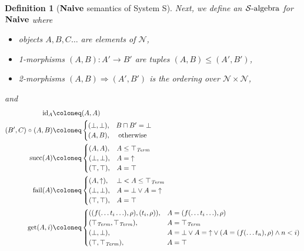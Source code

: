 \documentclass{article}
\newtheorem{definition}[theorem]{Definition}
\newcommand{\fail}{\ensuremath \text{$\uparrow$}}
\newcommand{\Term}{\ensuremath \mathit{Term}}
\newcommand{\Cat}[1]{\ensuremath \mathbf{#1}}
\newcommand{\id}{\ensuremath \operatorname{id}}
\newcommand{\Naive}{\ensuremath \Cat{Naive}}
\newcommand{\SAlgebra}{\ensuremath \mathcal{S}\text{-algebra}}
\newcommand{\lfail}{\ensuremath \operatorname{fail}}
\newcommand{\lsucc}{\ensuremath \operatorname{succ}}
\newcommand{\get}{\ensuremath \operatorname{get}}
\newcommand{\ttop}{\ensuremath \top_{\Term}}
\newcommand{\comp}{\ensuremath \mathrel{\circ}}
\begin{document}
\begin{definition}[$\Naive$ semantics of System S]
  Next, we define an $\SAlgebra$ for $\Naive$ where  
  \begin{itemize}
  \item objects $A,B,C \ldots$ are elements of $\mathcal{N}$,
  \item 1-morphisms $(A,B) : A' \rightarrow B'$ are tuples $(A,B) \leq (A',B')$,
  \item 2-morphisms $(A,B) \Rightarrow (A',B')$ is the ordering over $\mathcal{N} \times \mathcal{N}$,
  \end{itemize}
  and
  \begin{align*}
    \id_A &\coloneq (A,A) \\
    (B',C) \comp (A,B) &\coloneq
                \begin{cases}
                  (\bot,\bot), & B \sqcap B' = \bot \\
                  (A,B), & \text{ otherwise}
                \end{cases} \\
    \lsucc(A) &\coloneq
                \begin{cases} 
                  (A,A), & A \leq \ttop \\
                  (\bot,\bot), & A = \fail \\
                  (\top,\top), & A = \top \\
                \end{cases} \\
    \lfail(A) &\coloneq
                \begin{cases} (A,\fail), & \bot < A \leq \ttop \\
                  (\bot,\bot), & A = \bot \lor A = \fail \\
                  (\top,\top), & A = \top \\
                \end{cases} \\
    \get(A,i) &\coloneq
                \begin{cases}
                  ((f(\ldots t_i \ldots),\rho),(t_i,\rho)), & A = (f(\ldots t_i \ldots),\rho) \\
                  (\ttop,\ttop), & A = \ttop \\
                  (\bot,\bot), & A = \bot \lor A = \fail \lor \left(A = (f(\ldots t_n),\rho) \land n < i \right) \\
                  (\top,\ttop), & A = \top \\
                \end{cases} \\

\end{align*}
\end{definition}
\end{document}
